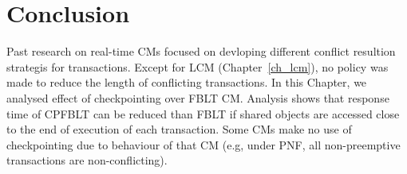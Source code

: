 \section{Conclusion}\label{sec:conclusion}
%
Past research on real-time CMs focused on devloping different conflict resultion strategis for transactions. Except for LCM (Chapter~\ref{ch_lcm}), no policy was made to reduce the length of conflicting transactions. In this Chapter, we analysed effect of checkpointing over FBLT CM. Analysis shows that response time of CPFBLT can be reduced than FBLT if shared objects are accessed close to the end of execution of each transaction. Some CMs make no use of checkpointing due to behaviour of that CM (e.g, under PNF, all non-preemptive transactions are non-conflicting).
%
